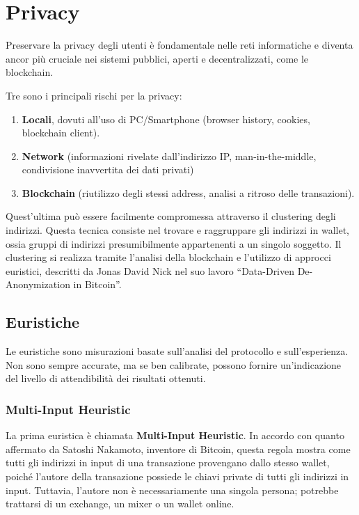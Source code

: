 \chapter{Privacy}
\newtheorem{definition}{Definition}
Preservare la privacy degli utenti è fondamentale nelle reti informatiche e diventa ancor più cruciale nei sistemi pubblici, aperti e decentralizzati, come le blockchain. 

Tre sono i principali rischi per la privacy:
\begin{enumerate}
    \item \textbf{Locali}, dovuti all'uso di PC/Smartphone (browser history, cookies, blockchain client).
    \item \textbf{Network} (informazioni rivelate dall'indirizzo IP, man-in-the-middle, condivisione inavvertita dei dati privati)
    \item \textbf{Blockchain} (riutilizzo degli stessi address, analisi a ritroso delle transazioni).
\end{enumerate}

Quest'ultima può essere facilmente compromessa attraverso il clustering degli indirizzi. Questa tecnica consiste nel trovare e raggruppare gli indirizzi in wallet, ossia gruppi di indirizzi presumibilmente appartenenti a un singolo soggetto. Il clustering si realizza tramite l'analisi della blockchain e l'utilizzo di approcci euristici, descritti da Jonas David Nick nel suo lavoro “Data-Driven De-Anonymization in Bitcoin”.

\section{Euristiche}

Le euristiche sono misurazioni basate sull'analisi del protocollo e sull'esperienza. Non sono sempre accurate, ma se ben calibrate, possono fornire un'indicazione del livello di attendibilità dei risultati ottenuti.

\subsection{Multi-Input Heuristic}

La prima euristica è chiamata \textbf{Multi-Input Heuristic}. In accordo con quanto affermato da Satoshi Nakamoto, inventore di Bitcoin, questa regola mostra come tutti gli indirizzi in input di una transazione provengano dallo stesso wallet, poiché l'autore della transazione possiede le chiavi private di tutti gli indirizzi in input. Tuttavia, l'autore non è necessariamente una singola persona; potrebbe trattarsi di un exchange, un mixer o un wallet online.

